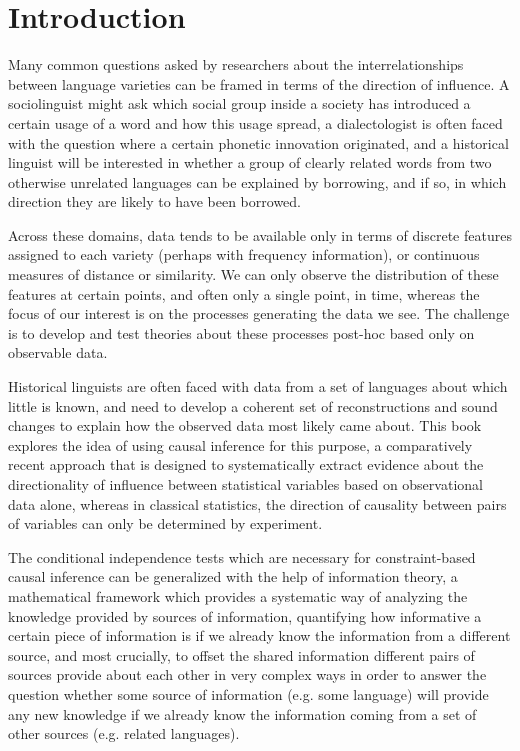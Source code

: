 \chapter{Introduction}\label{sec:1}
Many common questions asked by researchers about the interrelationships between language varieties can be framed in terms of the direction of influence. A sociolinguist might ask which social group inside a society has introduced a certain usage of a word and how this usage spread, a dialectologist is often faced with the question where a certain phonetic innovation originated, and a historical linguist will be interested in whether a group of clearly related words from two otherwise unrelated languages can be explained by borrowing, and if so, in which direction they are likely to have been borrowed.

Across these domains, data tends to be available only in terms of discrete features assigned to each variety (perhaps with frequency information), or continuous measures of distance or similarity. We can only observe the distribution of these features at certain points, and often only a single point, in time, whereas the focus of our interest is on the processes generating the data we see. The challenge is to develop and test theories about these processes post-hoc based only on observable data. 

Historical linguists are often faced with data from a set of languages about which little is known, and need to develop a coherent set of reconstructions and sound changes to explain how the observed data most likely came about. This book explores the idea of using causal inference for this purpose, a comparatively recent approach that is designed to systematically extract evidence about the directionality of influence between statistical variables based on observational data alone, whereas in classical statistics, the direction of causality between pairs of variables can only be determined by experiment.

The conditional independence tests which are necessary for constraint-based causal inference can be generalized with the help of information theory, a mathematical framework which provides a systematic way of analyzing the knowledge provided by sources of information, quantifying how informative a certain piece of information is if we already know the information from a different source, and most crucially, to offset the shared information different pairs of sources provide about each other in very complex ways in order to answer the question whether some source of information (e.g. some language) will provide any new knowledge if we already know the information coming from a set of other sources (e.g. related languages).

